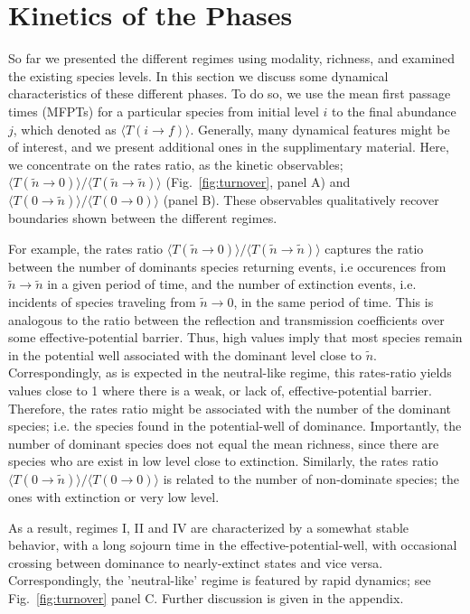 \documentclass[%
 amsmath,amssymb,
reprint,%
linenumbers]{revtex4-2}
\begin{document}
\section{Kinetics of the Phases}
\label{sec:Dynamics}

So far we presented the different regimes using modality, richness, and examined the existing species levels. 
In this section we discuss some dynamical characteristics of these different phases. 
To do so, we use the  mean first passage times (MFPTs) for a particular species from initial level $i$ to  the final abundance $j$, which denoted as $\langle T(i \rightarrow f)\rangle$. 
Generally, many dynamical features might be of interest, and we present additional ones in the supplimentary material.  
Here, we concentrate on  the rates ratio, as the kinetic observables; $\langle T(\tilde{n}\rightarrow 0)\rangle /\langle T(\tilde{n}\rightarrow \tilde{n})\rangle $ (Fig.~\ref{fig:turnover}, panel A) and $\langle T(0\rightarrow \tilde{n})\rangle /\langle T(0\rightarrow 0)\rangle $ (panel B). 
These observables qualitatively recover boundaries shown between the different regimes. 

For example, the rates ratio $\langle T(\tilde{n}\rightarrow 0)\rangle /\langle T(\tilde{n}\rightarrow \tilde{n})\rangle $ captures the ratio between the number of dominants species returning events, i.e occurences from $\tilde{n}\rightarrow \tilde{n} $ in a given period of time, and the number of extinction events, i.e. incidents of species traveling from  $\tilde{n}\rightarrow 0 $, in the same period of time. 
This is analogous to the ratio between the reflection and transmission coefficients over some effective-potential barrier. 
Thus, high values imply that most species remain in the potential well associated with the dominant level close to $\tilde{n}$. 
Correspondingly, as is expected in the neutral-like regime, this rates-ratio yields values close to 1 where there is a weak, or lack of, effective-potential barrier. Therefore, the rates ratio might be associated with the number of the dominant species; i.e. the species found in the potential-well of dominance. 
Importantly, the number of dominant species does not equal the mean richness, since there are species who are exist in low level close to extinction.  
Similarly, the rates ratio $\langle T(0\rightarrow \tilde{n})\rangle /\langle T(0\rightarrow 0)\rangle $ is related to the number of non-dominate species; the ones with extinction or very low level. 

As a result, regimes I, II and IV are characterized by a somewhat stable behavior, with a long sojourn time in the effective-potential-well, with occasional crossing between dominance to nearly-extinct states and vice versa. 
Correspondingly, the 'neutral-like' regime is featured by rapid dynamics; see Fig.~\ref{fig:turnover} panel C. Further discussion is given in the appendix. 
\end{document}
